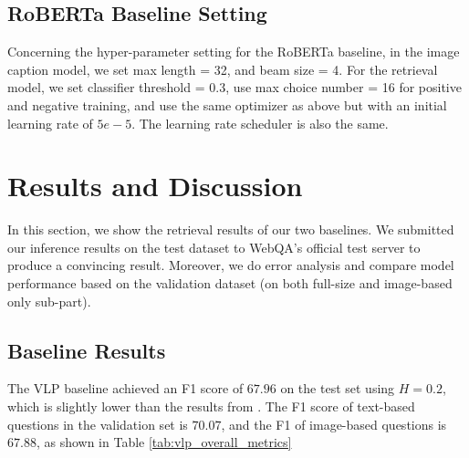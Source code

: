 \documentclass[nohyperref]{article}
\theoremstyle{plain}
\theoremstyle{definition}
\theoremstyle{remark}
\begin{document}
\subsection{RoBERTa Baseline Setting}
Concerning the hyper-parameter setting for the RoBERTa baseline, in the image caption model, we set max length = 32, and beam size = 4. For the retrieval model, we set classifier threshold = 0.3, use max choice number = 16 for positive and negative training, and use the same optimizer as above but with an initial learning rate of $5e-5$. The learning rate scheduler is also the same.


\section{Results and Discussion}\label{sec:results}

In this section, we show the retrieval results of our two baselines. We submitted our inference results on the test dataset to WebQA's official test server to produce a convincing result. Moreover, we do error analysis and compare model performance based on the validation dataset (on both full-size and image-based only sub-part).


\subsection{Baseline Results}

The VLP baseline achieved an F1 score of $67.96$ on the test set using $H=0.2$, which is slightly lower than the results from \cite{webqa}.
The F1 score of text-based questions in the validation set is $70.07$, and the F1 of image-based questions is
$67.88$, as shown in Table \ref{tab:vlp_overall_metrics}
\end{document}
